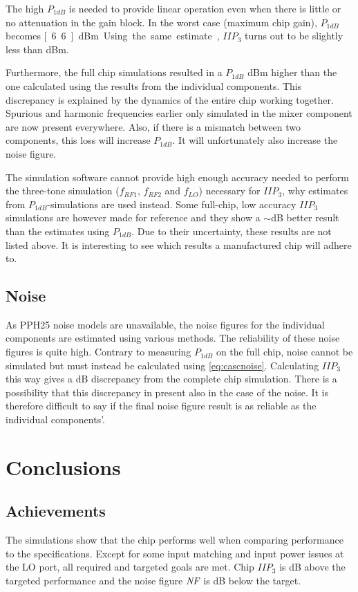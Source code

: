 			The high $P_{1dB}$ is needed to provide linear operation even when there is little or no attenuation in the gain block. In the worst case (maximum chip gain), $P_{1dB}$ becomes \unit[6.6]{dBm}. Using the same estimate, $IIP_3$ turns out to be slightly less than \unit[17]{dBm}.

			Furthermore, the full chip simulations resulted in a $P_{1dB}$ \unit[2]{dBm} higher than the one calculated using the results from the individual components. This discrepancy is explained by the dynamics of the entire chip working together. Spurious and harmonic frequencies earlier only simulated in the mixer component are now present everywhere. Also, if there is a mismatch between two components, this loss will increase $P_{1dB}$. It will unfortunately also increase the noise figure.

			The simulation software cannot provide high enough accuracy needed to perform the three-tone simulation ($f_{RF1}$, $f_{RF2}$ and $f_{LO}$) necessary for $IIP_3$, why estimates from $P_{1dB}$-simulations are used instead. Some full-chip, low accuracy $IIP_3$ simulations are however made for reference and they show a $\sim$\unit[3]{dB} better result than the estimates using $P_{1dB}$. Due to their uncertainty, these results are not listed above. It is interesting to see which results a manufactured chip will adhere to.

		\subsection{Noise}
			As PPH25 noise models are unavailable, the noise figures for the individual components are estimated using various methods. The reliability of these noise figures is quite high. Contrary to measuring $P_{1dB}$ on the full chip, noise cannot be simulated but must instead be calculated using \autoref{eq:cascnoise}. Calculating $IIP_3$ this way gives a \unit[2]{dB} discrepancy from the complete chip simulation. There is a possibility that this discrepancy in present also in the case of the noise. It is therefore difficult to say if the final noise figure result is as reliable as the individual components'.

	\section{Conclusions}
		\subsection{Achievements}
			The simulations show that the chip performs well when comparing performance to the specifications. Except for some input matching and input power issues at the LO port, all required and targeted goals are met. Chip $IIP_3$ is \unit[3]{dB} above the targeted performance and the noise figure $\emph{NF}$ is \unit[1]{dB} below the target.

